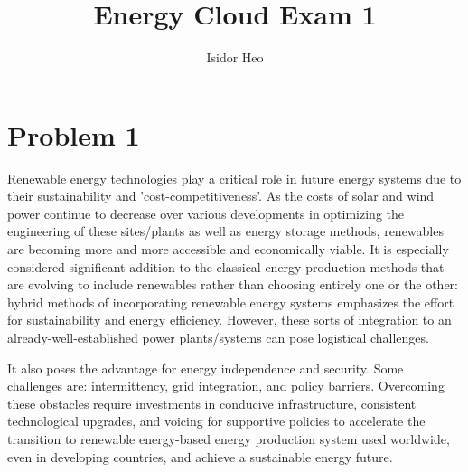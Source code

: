 \documentclass{article}
\title{Energy Cloud Exam 1}
\author{Isidor Heo}
\begin{document}
\maketitle 

\section*{Problem 1}

Renewable energy technologies play a critical role in future energy systems due to their sustainability and 'cost-competitiveness'. As the costs of solar and wind power continue to decrease over various developments in optimizing the engineering of these sites/plants as well as energy storage methods, renewables are becoming more and more accessible and economically viable. It is especially considered significant addition to the classical energy production methods that are evolving to include renewables rather than choosing entirely one or the other: hybrid methods of incorporating renewable energy systems emphasizes the effort for sustainability and energy efficiency. However, these sorts of integration to an already-well-established power plants/systems can pose logistical challenges.

It also poses the advantage for energy independence and security. Some challenges are: intermittency, grid integration, and policy barriers. Overcoming these obstacles require investments in conducive infrastructure, consistent technological upgrades, and voicing for supportive policies to accelerate the transition to renewable energy-based energy production system used worldwide, even in developing countries, and achieve a sustainable energy future.



\end{document}
